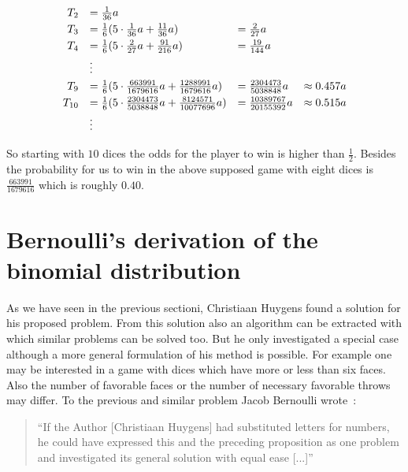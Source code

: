 \begin{align}
  \begin{array}{rlll}
    T_2 & = \frac 1{36} a \nl
    T_3 & = \frac 16 (5 \cdot \frac 1{36} a + \frac{11}{36} a) &= \frac 2{27} a \nl
    T_4 & = \frac 16 (5 \cdot \frac 2{27} a + \frac{91}{216} a) &= \frac {19}{144} a \nl
    & \vdots \nl
    T_9 & = \frac 16 (5 \cdot \frac {663991}{1679616} a + \frac{1288991}{1679616} a) &= \frac {2304473}{5038848} a & \approx 0.457 a \nl
    T_{10} & = \frac 16 (5 \cdot \frac{2304473}{5038848} a + \frac{8124571}{10077696} a) &= \frac{10389767}{20155392} a & \approx 0.515 a \nl
    & \vdots 
  \end{array}
\end{align}

So starting with $10$ dices the odds for the player to win is higher than $\tfrac 12$. Besides the probability for us to win in the above supposed game with eight dices is $\tfrac{663991}{1679616}$ which is roughly $0.40$.

\section{Bernoulli's derivation of the binomial distribution}


As we have seen in the previous sectioni, Christiaan Huygens found a solution for his proposed problem. From this solution also an algorithm can be extracted with which similar problems can be solved too. But he only investigated a special case although a more general formulation of his method is possible. For example one may be interested in a game with dices which have more or less than six faces. Also the number of favorable faces or the number of necessary favorable throws may differ. To the previous and similar problem Jacob Bernoulli wrote~\cite[p. 157]{bernoulli}:

\begin{quote}
  ``If the Author [Christiaan Huygens] had substituted letters for numbers, he could have expressed this and the preceding proposition as one problem and investigated its general solution with equal ease [...]''
\end{quote}

